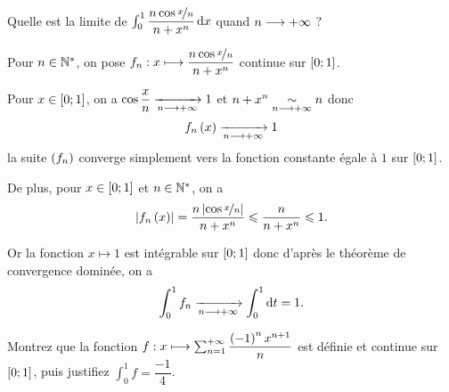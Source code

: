 \begin{exo}
Quelle est la limite de \(\int_0^1\dfrac{n\cos\nicefrac{x}{n}}{n+x^n}\odif{x}\) quand \(n\to\pinf\) ?
\end{exo}

\begin{corr}
Pour \(n\in\Ns\), on pose \(f_n:x\mapsto\dfrac{n\cos\nicefrac{x}{n}}{n+x^n}\) continue sur \(\intervii{0}{1}\).

Pour \(x\in\intervii{0}{1}\), on a \(\cos\dfrac{x}{n}\tendqd{n\to\pinf}1\) et \(n+x^n\simqd{n\to\pinf}n\) donc \[f_n\paren{x}\tendqd{n\to\pinf}1\] \ie la suite \(\paren{f_n}\) converge simplement vers la fonction constante égale à \(1\) sur \(\intervii{0}{1}\).

De plus, pour \(x\in\intervii{0}{1}\) et \(n\in\Ns\), on a \[\abs{f_n\paren{x}}=\dfrac{n\abs{\cos\nicefrac{x}{n}}}{n+x^n}\leq\dfrac{n}{n+x^n}\leq1.\]

Or la fonction \(x\mapsto1\) est intégrable sur \(\intervii{0}{1}\) donc d'après le théorème de convergence dominée, on a \[\int_0^1f_n\tendqd{n\to\pinf}\int_0^1\odif{t}=1.\]
\end{corr}

\begin{exo}
Montrez que la fonction \(f:x\mapsto\sum_{n=1}^{\pinf}\dfrac{\paren{-1}^nx^{n+1}}{n}\) est définie et continue sur \(\intervii{0}{1}\), puis justifiez \(\int_0^1f=\dfrac{-1}{4}\).
\end{exo}

